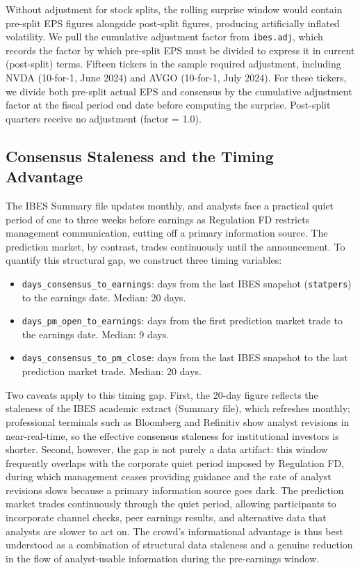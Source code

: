 \documentclass[11pt]{article}
\begin{document}
Without adjustment for stock splits, the rolling surprise window would contain pre-split EPS figures alongside post-split figures, producing artificially inflated volatility. We pull the cumulative adjustment factor from \texttt{ibes.adj}, which records the factor by which pre-split EPS must be divided to express it in current (post-split) terms. Fifteen tickers in the sample required adjustment, including NVDA (10-for-1, June 2024) and AVGO (10-for-1, July 2024). For these tickers, we divide both pre-split actual EPS and consensus by the cumulative adjustment factor at the fiscal period end date before computing the surprise. Post-split quarters receive no adjustment (factor = 1.0).

\subsection{Consensus Staleness and the Timing Advantage}

The IBES Summary file updates monthly, and analysts face a practical quiet period of one to three weeks before earnings as Regulation FD \citep{heflin2003regulation} restricts management communication, cutting off a primary information source. The prediction market, by contrast, trades continuously until the announcement. To quantify this structural gap, we construct three timing variables:

\begin{itemize}
\item \texttt{days\_consensus\_to\_earnings}: days from the last IBES snapshot (\texttt{statpers}) to the earnings date. Median: 20 days.
\item \texttt{days\_pm\_open\_to\_earnings}: days from the first prediction market trade to the earnings date. Median: 9 days.
\item \texttt{days\_consensus\_to\_pm\_close}: days from the last IBES snapshot to the last prediction market trade. Median: 20 days.
\end{itemize}

Two caveats apply to this timing gap. First, the 20-day figure reflects the staleness of the IBES academic extract (Summary file), which refreshes monthly; professional terminals such as Bloomberg and Refinitiv show analyst revisions in near-real-time, so the effective consensus staleness for institutional investors is shorter. Second, however, the gap is not purely a data artifact: this window frequently overlaps with the corporate quiet period imposed by Regulation FD, during which management ceases providing guidance and the rate of analyst revisions slows because a primary information source goes dark. The prediction market trades continuously through the quiet period, allowing participants to incorporate channel checks, peer earnings results, and alternative data that analysts are slower to act on. The crowd's informational advantage is thus best understood as a combination of structural data staleness and a genuine reduction in the flow of analyst-usable information during the pre-earnings window.
\end{document}

